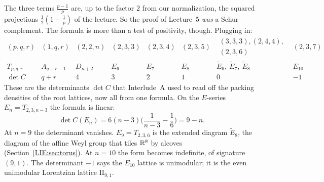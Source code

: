 The three terms $\frac{p-1}p$ are, up to the factor $2$ from our normalization, the squared
projections $\frac12(1-\frac1p)$ of the lecture. So the proof of Lecture~5 \emph{was} a Schur complement.
The formula is more than a test of positivity, though. Plugging in:
{\small\setlength{\arraycolsep}{4pt}\[
  \begin{array}{l|cccccccc}
  (p,q,r) & (1,q,r) & (2,2,n) & (2,3,3) & (2,3,4) & (2,3,5) & \begin{smallmatrix}(3,3,3),(2,4,4),\\(2,3,6)\end{smallmatrix} & (2,3,7)\\ \hline
  T_{p,q,r} & A_{q+r-1} & D_{n+2} & E_6 & E_7 & E_8 & \tilde E_6,\ \tilde E_7,\ \tilde E_8 & E_{10}\\
  \det C & q+r & 4 & 3 & 2 & 1 & 0 & -1
  \end{array}
\]}
These are the determinants $\det C$ that Interlude~A used to read off the packing densities of the
root lattices, now all from one formula. On the $E$-series $E_n=T_{2,3,n-3}$ the formula is linear:
\begin{equation}\label{DYN:eq:Edet}
  \det C(E_n)=6(n-3)\Big(\frac1{n-3}-\frac16\Big)=9-n .
\end{equation}
At $n=9$ the determinant vanishes. $E_9=T_{2,3,6}$ is the extended diagram $\tilde E_8$, the
diagram of the affine Weyl group that tiles $\mathbb{R}^8$ by alcoves (Section~\ref{LIE:sec:torus}). At
$n=10$ the form becomes indefinite, of signature $(9,1)$. The determinant $-1$ says the $E_{10}$ lattice is
unimodular; it is the even unimodular Lorentzian lattice $\mathrm{II}_{9,1}$.

